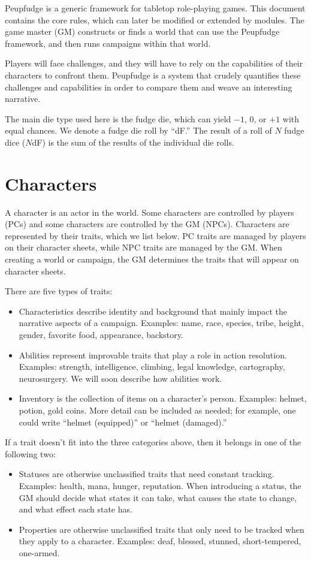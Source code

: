 Peupfudge is a generic framework for tabletop role-playing games.
This document contains the core rules, which can later be modified or extended by modules.
The game master (GM) constructs or finds a world that can use the Peupfudge framework,
and then runs campaigns within that world. 


Players will face challenges, and they will have to rely on the capabilities of their characters to confront them.
Peupfudge is a system that crudely quantifies these challenges and capabilities in order to compare them and weave an interesting narrative.

The main die type used here is the fudge die, which can yield $-1$, $0$, or $+1$ with equal chances.
We denote a fudge die roll by ``dF.'' The result of a roll of $N$ fudge dice ($N$dF) is the sum of the results of the individual die rolls.

\section*{Characters}
A character is an actor in the world.
Some characters are controlled by players (PCs) and some characters are controlled by the GM (NPCs).
Characters are represented by their traits, which we list below.
PC traits are managed by players on their character sheets, while NPC traits are managed by the GM.
When creating a world or campaign, the GM determines the traits that will appear on character sheets.

There are five types of traits:
\begin{itemize}
\item
Characteristics describe identity and background that mainly impact the narrative aspects of a campaign.
Examples: name, race, species, tribe, height, gender, favorite food, appearance, backstory.
\item
Abilities represent improvable traits that play a role in action resolution.
Examples: strength, intelligence, climbing, legal knowledge, cartography, neurosurgery.
We will soon describe how abilities work.
\item
Inventory is the collection of items on a character’s person.
Examples: helmet, potion, gold coins.
More detail can be included as needed; for example, one could write “helmet (equipped)” or “helmet (damaged).”
\end{itemize}
If a trait doesn’t fit into the three categories above, then it belongs in one of the following two:
\begin{itemize}
\item
Statuses are otherwise unclassified traits that need constant tracking.
Examples: health, mana, hunger, reputation.
When introducing a status, the GM should decide what states it can take, what causes the state to change, and what effect each state has.
\item
Properties are otherwise unclassified traits that only need to be tracked when they apply to a character.
Examples: deaf, blessed, stunned, short-tempered, one-armed.
\end{itemize}

